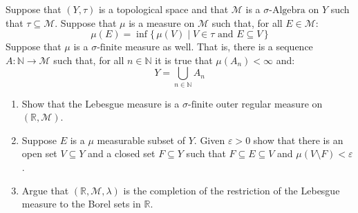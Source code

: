 \documentclass[crop=false,class=article]{standalone}                           %
\begin{document}
        \begin{problem}
            Suppose that $(Y,\tau)$ is a topological space and that
            $\mathcal{M}$ is a $\sigma\textrm{-Algebra}$ on $Y$ such that
            $\tau\subseteq\mathcal{M}$. Suppose that $\mu$ is a measure on
            $\mathcal{M}$ such that, for all $E\in\mathcal{M}$:
            \begin{equation}
                \mu(E)
                =\inf\{\,\mu(V)\;|\;V\in\tau\textrm{ and }E\subseteq{V}\,\}
            \end{equation}
            Suppose that $\mu$ is a $\sigma\textrm{-finite}$ measure as well.
            That is, there is a sequence $A:\mathbb{N}\rightarrow\mathcal{M}$
            such that, for all $n\in\mathbb{N}$ it is true that
            $\mu(A_{n})<\infty$ and:
            \begin{equation}
                Y=\bigcup_{n\in\mathbb{N}}A_{n}
            \end{equation}
            \begin{enumerate}
                \item   Show that the Lebesgue measure is a
                        $\sigma\textrm{-finite}$ outer regular measure on
                        $(\mathbb{R},\mathcal{M})$.
                \item   Suppose $E$ is a $\mu$ measurable subset of $Y$. Given
                        $\varepsilon>0$ show that there is an open set
                        $V\subseteq{Y}$ and a closed set $F\subseteq{Y}$ such
                        that $F\subseteq{E}\subseteq{V}$ and
                        $\mu(V\setminus{F})<\varepsilon$.
                \item   Argue that $(\mathbb{R},\mathcal{M},\lambda)$ is the
                        completion of the restriction of the Lebesgue measure
                        to the Borel sets in $\mathbb{R}$.
            \end{enumerate}
        \end{problem}
\end{document}

